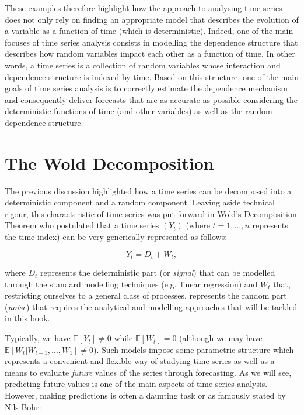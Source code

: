 \documentclass[]{book}
\theoremstyle{definition}
\theoremstyle{definition}
\theoremstyle{definition}
\theoremstyle{remark}
\begin{document}
These examples therefore highlight how the approach to analysing time
series does not only rely on finding an appropriate model that describes
the evolution of a variable as a function of time (which is
deterministic). Indeed, one of the main focuses of time series analysis
consists in modelling the dependence structure that describes how random
variables impact each other as a function of time. In other words, a
time series is a collection of random variables whose interaction and
dependence structure is indexed by time. Based on this structure, one of
the main goals of time series analysis is to correctly estimate the
dependence mechanism and consequently deliver forecasts that are as
accurate as possible considering the deterministic functions of time
(and other variables) as well as the random dependence structure.

\hypertarget{the-wold-decomposition}{%
\section{The Wold Decomposition}\label{the-wold-decomposition}}

The previous discussion highlighted how a time series can be decomposed
into a deterministic component and a random component. Leaving aside
technical rigour, this characteristic of time series was put forward in
Wold's Decomposition Theorem who postulated that a time series \((Y_t)\)
(where \(t = 1,...,n\) represents the time index) can be very
generically represented as follows:

\[Y_t = D_t + W_t,\]

where \(D_t\) represents the deterministic part (or \emph{signal}) that
can be modelled through the standard modelling techniques (e.g.~linear
regression) and \(W_t\) that, restricting ourselves to a general class
of processes, represents the random part (\emph{noise}) that requires
the analytical and modelling approaches that will be tackled in this
book.

Typically, we have \(\mathbb{E}[Y_t] \neq 0\) while
\(\mathbb{E}[W_t] = 0\) (although we may have
\(\mathbb{E}[W_t | W_{t-1}, ..., W_1] \neq 0\)). Such models impose some
parametric structure which represents a convenient and flexible way of
studying time series as well as a means to evaluate \emph{future} values
of the series through forecasting. As we will see, predicting future
values is one of the main aspects of time series analysis. However,
making predictions is often a daunting task or as famously stated by
Nils Bohr:
\end{document}
